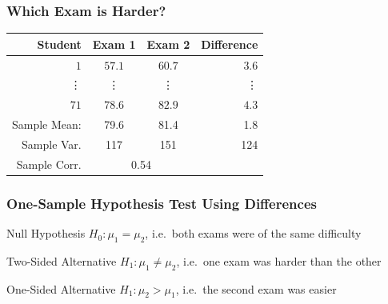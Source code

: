 \documentclass[handout]{beamer}
\begin{document}
\begin{frame}
\frametitle{Which Exam is Harder?}
%
\begin{table}[!tbp]
\begin{center}
\begin{tabular}{rccr}
\hline\hline
\multicolumn{1}{r}{Student}&\multicolumn{1}{c}{Exam 1}&\multicolumn{1}{c}{Exam 2}&\multicolumn{1}{r}{Difference}\tabularnewline
\hline
$ 1$&$57.1$&$60.7$&$  3.6$\tabularnewline
\vdots&\vdots&\vdots&\vdots\\
$71$&$78.6$&$82.9$&$  4.3$\tabularnewline
\hline
Sample Mean: & 79.6 & 81.4  &1.8\\
Sample Var. &117  & 151 & 124\\
Sample Corr.& \multicolumn{2}{c}{0.54}&\\
\hline
\end{tabular}
\end{center}
\end{table}

\end{frame}
\begin{frame}
\frametitle{One-Sample Hypothesis Test Using Differences}
\small
{}
\vspace{0.1em}
\begin{block}{Null Hypothesis}
$H_0\colon \mu_1 = \mu_2$, i.e.\ both exams were of the same difficulty
\end{block}
\begin{block}{Two-Sided Alternative}
$H_1\colon \mu_1 \neq \mu_2$, i.e.\ one exam was harder than the other
\end{block}
\begin{block}{One-Sided Alternative}
$H_1\colon \mu_2 > \mu_1$, i.e.\ the second exam was easier
\end{block}

\end{frame}
\end{document}
